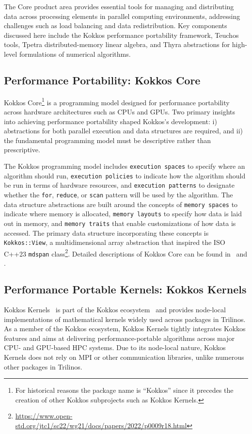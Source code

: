 
The Core product area provides essential tools for managing and distributing data across processing elements in parallel computing environments, addressing challenges such as load balancing and data redistribution. Key components discussed here include the Kokkos performance portability framework, Teuchos tools, Tpetra distributed-memory linear algebra, and Thyra abstractions for high-level formulations of numerical algorithms.

\subsection{Performance Portability: Kokkos Core}\label{subsec:kokkos}
Kokkos Core\footnote{For historical reasons the package name is ``Kokkos'' since it precedes the creation of other Kokkos subprojects such as Kokkos Kernels.} is a programming model designed for performance portability across hardware architectures such as CPUs and GPUs. Two primary insights into achieving performance portability shaped Kokkos's development:
i) abstractions for both parallel execution and data structures are required, and
ii) the fundamental programming model must be descriptive rather than prescriptive.

The Kokkos programming model includes \texttt{execution spaces} to specify where an algorithm should run, \texttt{execution policies} to indicate how the algorithm should be run in terms of hardware resources, and \texttt{execution patterns} to designate whether the \texttt{for}, \texttt{reduce}, or \texttt{scan} pattern will be used by the algorithm. The data structure abstractions are built around the concepts of \texttt{memory spaces} to indicate where memory is allocated, \texttt{memory layouts} to specify how data is laid out in memory, and \texttt{memory traits} that enable customizations of how data is accessed. The primary data structure incorporating
these concepts is \texttt{Kokkos::View}, a multidimensional array abstraction that inspired
the ISO C++23 \texttt{mdspan} class\footnote{\url{https://www.open-std.org/jtc1/sc22/wg21/docs/papers/2022/p0009r18.html}}. Detailed descriptions of Kokkos Core can be found
in~\cite{edwards2014} and \cite{trott2022kokkos}.

\subsection{Performance Portable Kernels: Kokkos Kernels}\label{subsec:kk}
Kokkos Kernels~\cite{rajamanickam2021kokkoskernels} is part of the Kokkos ecosystem~\cite{trott2021kokkos} and provides node-local implementations of mathematical kernels widely used across packages in Trilinos. As a member of the Kokkos ecosystem, Kokkos Kernels tightly integrates Kokkos features and aims at delivering performance-portable algorithms across major CPU- and GPU-based HPC systems. Due to its node-local nature, Kokkos Kernels does not rely on MPI or other communication libraries, unlike numerous other packages in Trilinos.

